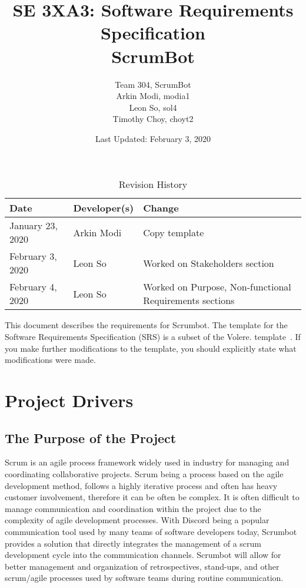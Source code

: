 \documentclass[12pt, titlepage]{article}
\title{SE 3XA3: Software Requirements Specification\\ScrumBot}
\author{
    Team 304, ScrumBot
        \\ Arkin Modi, modia1
        \\ Leon So, sol4
        \\ Timothy Choy, choyt2
}
\date{Last Updated: February 3, 2020}
\begin{document}
\maketitle

\tableofcontents
\listoftables
\listoffigures

\begin{table}[bp]
    \caption{Revision History} \label{TblRevisionHistory}
    \begin{tabularx}{\textwidth}{llX}
        \toprule
            \textbf{Date} & \textbf{Developer(s)} & \textbf{Change}\\
        \midrule
            January 23, 2020 & Arkin Modi & Copy template\\
            February 3, 2020 & Leon So & Worked on Stakeholders section\\
            February 4, 2020 & Leon So & Worked on Purpose, Non-functional Requirements sections\\
        \bottomrule
    \end{tabularx}
\end{table}

\newpage


This document describes the requirements for Scrumbot.  The template for the Software
Requirements Specification (SRS) is a subset of the Volere.
template~\citep{RobertsonAndRobertson2012}.  If you make further modifications
to the template, you should explicitly state what modifications were made.

\section{Project Drivers}

\subsection{The Purpose of the Project}
Scrum is an agile process framework widely used in industry for managing and coordinating collaborative projects. Scrum being a process based on the agile development method, follows a highly iterative process and often has heavy customer involvement, therefore it can be often be complex. It is often difficult to manage communication and coordination within the project due to the complexity of agile development processes. With Discord being a popular communication tool used by many teams of software developers today, Scrumbot provides a solution that directly integrates the management of a scrum development cycle into the communication channels. Scrumbot will allow for better management and organization of retrospectives, stand-ups, and other scrum/agile processes used by software teams during routine communication.\\
\end{document}
